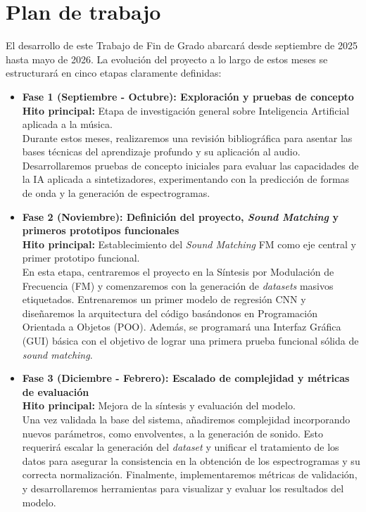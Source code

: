 \section{Plan de trabajo}
El desarrollo de este Trabajo de Fin de Grado abarcará desde septiembre de 2025 hasta mayo de 2026. La evolución del proyecto a lo largo de estos meses se estructurará en cinco etapas claramente definidas:

\begin{itemize}
    \item \textbf{Fase 1 (Septiembre - Octubre): Exploración y pruebas de concepto} \\
    \textbf{Hito principal:} Etapa de investigación general sobre Inteligencia Artificial aplicada a la música. \\
    Durante estos meses, realizaremos una revisión bibliográfica para asentar las bases técnicas del aprendizaje profundo y su aplicación al audio. Desarrollaremos pruebas de concepto iniciales para evaluar las capacidades de la IA aplicada a sintetizadores, experimentando con la predicción de formas de onda y la generación de espectrogramas.

    \item \textbf{Fase 2 (Noviembre): Definición del proyecto, \textit{Sound Matching} y primeros prototipos funcionales} \\
    \textbf{Hito principal:} Establecimiento del \textit{Sound Matching} FM como eje central y primer prototipo funcional. \\
    En esta etapa, centraremos el proyecto en la Síntesis por Modulación de Frecuencia (FM) y comenzaremos con la generación de \textit{datasets} masivos etiquetados. Entrenaremos un primer modelo de regresión CNN y diseñaremos la arquitectura del código basándonos en Programación Orientada a Objetos (POO). Además, se programará una Interfaz Gráfica (GUI) básica con el objetivo de lograr una primera prueba funcional sólida de \textit{sound matching}.

    \item \textbf{Fase 3 (Diciembre - Febrero): Escalado de complejidad y métricas de evaluación} \\
    \textbf{Hito principal:} Mejora de la síntesis y evaluación del modelo. \\
    Una vez validada la base del sistema, añadiremos complejidad incorporando nuevos parámetros, como envolventes, a la generación de sonido. Esto requerirá escalar la generación del \textit{dataset} y unificar el tratamiento de los datos para asegurar la consistencia en la obtención de los espectrogramas y su correcta normalización. Finalmente, implementaremos métricas de validación, y desarrollaremos herramientas para visualizar y evaluar los resultados del modelo.


\end{itemize}
